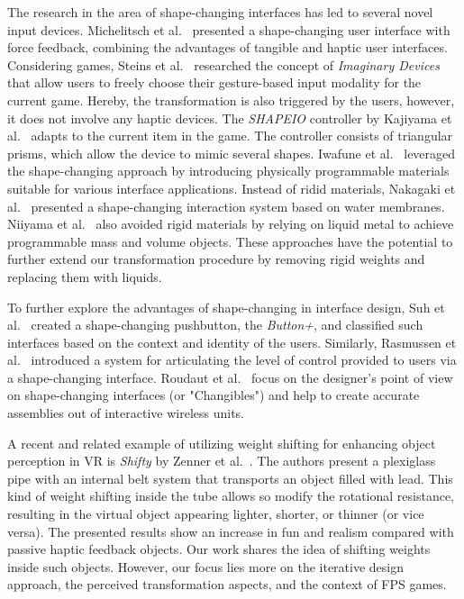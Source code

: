 \documentclass{sigchi}
\begin{document}
The research in the area of shape-changing interfaces has led to several novel input devices. Michelitsch et al.~\cite{Michelitsch:2004:HCN:985921.986050} presented a shape-changing user interface with force feedback, combining the advantages of tangible and haptic user interfaces. Considering games, Steins et al.~\cite{Steins:2013:IDG:2493190.2493208} researched the concept of \textit{Imaginary Devices} that allow users to freely choose their gesture-based input modality for the current game. Hereby, the transformation is also triggered by the users, however, it does not involve any haptic devices. The \textit{SHAPEIO} controller by Kajiyama et al.~\cite{kajiyama2015shapio} adapts to the current item in the game. The controller consists of triangular prisms, which allow the device to mimic several shapes. Iwafune et al.~\cite{Iwafune:2016:CSP:2988240.2988252} leveraged the shape-changing approach by introducing physically programmable materials suitable for various interface applications. Instead of ridid materials, Nakagaki et al.~\cite{Nakagaki:2016:HSC:2839462.2856517} presented a shape-changing interaction system based on water membranes. Niiyama et al.~\cite{Niiyama:2014:WVC:2540930.2540953} also avoided rigid materials by relying on liquid metal to achieve programmable mass and volume objects. These approaches have the potential to further extend our transformation procedure by removing rigid weights and replacing them with liquids.


To further explore the advantages of shape-changing in interface design, Suh et al.~\cite{Suh:2017:BSU:3024969.3024980} created a shape-changing pushbutton, the \textit{Button+}, and classified such interfaces based on the context and identity of the users. Similarly, Rasmussen et al.~\cite{Rasmussen:2016:BUS:2839462.2839499} introduced a system for articulating the level of control provided to users via a shape-changing interface. Roudaut et al.~\cite{Roudaut:2014:CAD:2611205.2557006} focus on the designer's point of view on shape-changing interfaces (or "Changibles") and help to create accurate assemblies out of interactive wireless units. 


A recent and related example of utilizing weight shifting for enhancing object perception in VR is \textit{Shifty} by Zenner et al.~\cite{7833030}. The authors present a plexiglass pipe with an internal belt system that transports an object filled with lead. This kind of weight shifting inside the tube allows so modify the rotational resistance, resulting in the virtual object appearing lighter, shorter, or thinner (or vice versa). The presented results show an increase in fun and realism compared with passive haptic feedback objects. Our work shares the idea of shifting weights inside such objects. However, our focus lies more on the iterative design approach, the perceived transformation aspects, and the context of FPS games. 
\end{document}
